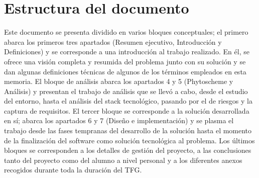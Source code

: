 \section{Estructura del documento} \label{introduccion.estructura}
	
Este documento se presenta dividido en varios bloques conceptuales; el primero abarca los primeros tres apartados (Resumen ejecutivo, Introducción  y Definiciones) y se corresponde a una introducción al trabajo realizado. En él, se ofrece una visión completa y resumida del problema junto con su solución y se dan algunas definiciones técnicas de algunos de los términos empleados en esta memoria. El bloque de análisis abarca los apartados 4 y 5 (Phytoscheme y Análisis) y presentan el trabajo de análisis que se llevó a cabo, desde el estudio del entorno, hasta el análisis del stack tecnológico, pasando por el de riesgos y la captura de requisitos. El tercer bloque se corresponde a la solución desarrollada en sí; abarca los apartados 6 y 7 (Diseño e implementación) y se plasma el trabajo desde las fases tempranas del desarrollo de la solución hasta el momento de la finalización del software como solución tecnológica al problema.  Los últimos bloques se corresponden a los detalles de gestión del proyecto, a las conclusiones tanto del proyecto como del alumno a nivel personal y a los diferentes anexos recogidos durante toda la duración del TFG.
